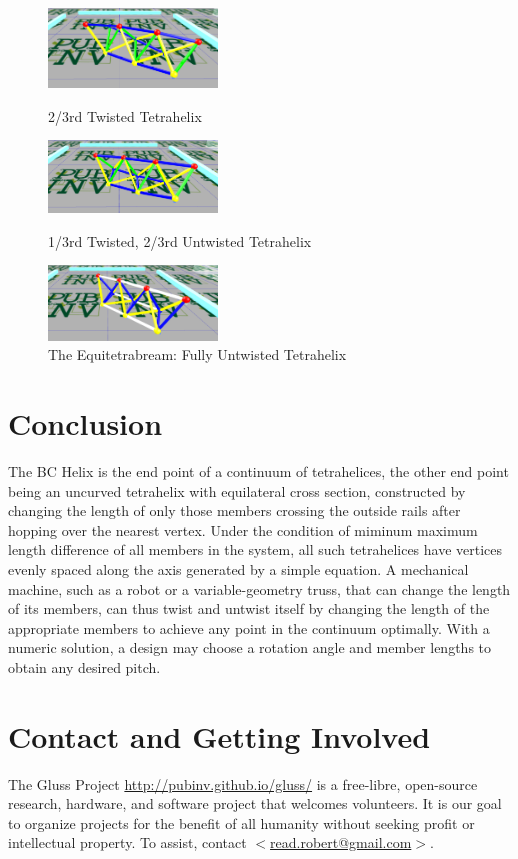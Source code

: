 \documentclass[11pt]{article}
\begin{document}
\begin{figure}[H] %
  \centering
     \includegraphics[width=0.4\textwidth]{figures/Tetrahelix1.png}
     \caption{2/3rd Twisted Tetrahelix}
     \includegraphics[width=0.4\textwidth]{figures/Tetrahelix2.png}
     \caption{1/3rd Twisted, 2/3rd Untwisted Tetrahelix}
     \includegraphics[width=0.4\textwidth]{figures/Tetrahelix3.png}
     \caption{The Equitetrabream: Fully Untwisted Tetrahelix}
\end{figure}

\section{Conclusion}

The BC Helix is the end point of a continuum of tetrahelices, the
other end point being an uncurved tetrahelix with equilateral cross
section, constructed by changing the length of only those members
crossing the outside rails after hopping over the nearest
vertex. Under the condition of miminum maximum length difference of
all members in the system, all such tetrahelices have vertices evenly
spaced along the axis generated by a simple equation.  A mechanical
machine, such as a robot or a variable-geometry truss, that can change
the length of its members, can thus twist and untwist itself by
changing the length of the appropriate members to achieve any point in
the continuum optimally. With a numeric solution, a design may choose
a rotation angle and member lengths to obtain any desired pitch.

\section{Contact and Getting Involved}

The Gluss Project \url{http://pubinv.github.io/gluss/}
is a free-libre, open-source research, hardware, and software project that welcomes volunteers.
It is our goal to organize projects for the benefit of all humanity without seeking profit or intellectual property.
To assist, contact \href{mailto:read.robert@gmail.com}{$<$read.robert@gmail.com$>$}.



\end{document}
